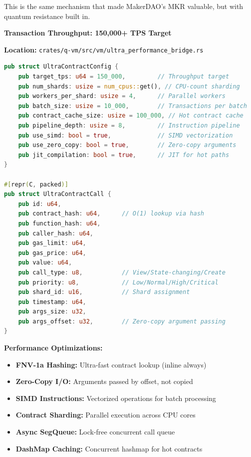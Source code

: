 \documentclass[11pt,a4paper]{article}
\begin{document}
This is the same mechanism that made MakerDAO's MKR valuable, but with quantum resistance built in.

\textbf{Transaction Throughput: 150,000+ TPS Target}

\textbf{Location:} \texttt{crates/q-vm/src/vm/ultra\_performance\_bridge.rs}

\begin{lstlisting}[language=Rust,caption={Ultra-Performance Configuration}]
pub struct UltraContractConfig {
    pub target_tps: u64 = 150_000,         // Throughput target
    pub num_shards: usize = num_cpus::get(), // CPU-count sharding
    pub workers_per_shard: usize = 4,      // Parallel workers
    pub batch_size: usize = 10_000,        // Transactions per batch
    pub contract_cache_size: usize = 100_000, // Hot contract cache
    pub pipeline_depth: usize = 8,         // Instruction pipeline
    pub use_simd: bool = true,             // SIMD vectorization
    pub use_zero_copy: bool = true,        // Zero-copy arguments
    pub jit_compilation: bool = true,      // JIT for hot paths
}

#[repr(C, packed)]
pub struct UltraContractCall {
    pub id: u64,
    pub contract_hash: u64,      // O(1) lookup via hash
    pub function_hash: u64,
    pub caller_hash: u64,
    pub gas_limit: u64,
    pub gas_price: u64,
    pub value: u64,
    pub call_type: u8,           // View/State-changing/Create
    pub priority: u8,            // Low/Normal/High/Critical
    pub shard_id: u16,           // Shard assignment
    pub timestamp: u64,
    pub args_size: u32,
    pub args_offset: u32,        // Zero-copy argument passing
}
\end{lstlisting}

\textbf{Performance Optimizations:}
\begin{itemize}[leftmargin=*]
\item \textbf{FNV-1a Hashing:} Ultra-fast contract lookup (inline always)
\item \textbf{Zero-Copy I/O:} Arguments passed by offset, not copied
\item \textbf{SIMD Instructions:} Vectorized operations for batch processing
\item \textbf{Contract Sharding:} Parallel execution across CPU cores
\item \textbf{Async SegQueue:} Lock-free concurrent call queue
\item \textbf{DashMap Caching:} Concurrent hashmap for hot contracts
\end{itemize}
\end{document}
